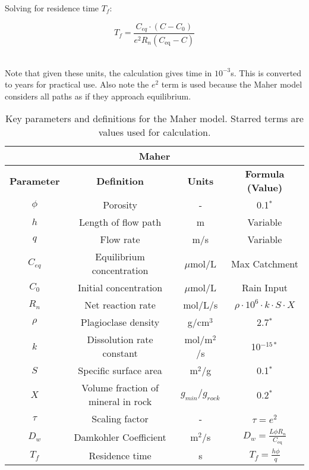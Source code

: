 \begin{tcolorbox}
{\begin{multicols}{2}

Solving for residence time \( T_f \):

\columnbreak
\begin{equation}
    T_f = \frac{C_{eq} \cdot \left(C - C_0\right)}{e^2 R_n \left( C_{\text{eq}} - C \right)}
\end{equation}
\

\end{multicols}

Note that given these units, the calculation gives time in \( 10^{-3} \)s. This is converted to years for practical use. Also note the $e^2$ term is used because the Maher model considers all paths as if they approach equilibrium.

\begin{table}[H]
    \centering
    \begin{tabular}{|c|c|c|c|}
        \hline  %
        \multicolumn{4}{|c|}{\textbf{Maher}} \\  
        \hline
        \textbf{Parameter} & \textbf{Definition} & \textbf{Units} & \textbf{Formula (Value)} \\  
        $\phi$ & Porosity & - & 0.1$^*$ \\
        $h$ & Length of flow path & m & Variable \\
        $q$ & Flow rate & m/s & Variable \\
        $C_{eq}$ & Equilibrium concentration & $\mu$mol/L & Max Catchment \\
        $C_0$ & Initial concentration & $\mu$mol/L & Rain Input \\
        $R_n$ & Net reaction rate & mol/L/s & $\rho \cdot 10^6 \cdot k \cdot S \cdot X $ \\
        $\rho$ & Plagioclase density & g/cm$^3$ & 2.7$^*$ \\
        $k$ & Dissolution rate constant & mol/m$^2$/s & 10$^{-15*}$ \\
        $S$ & Specific surface area & m$^2$/g & 0.1$^*$ \\
        $X$ & Volume fraction of mineral in rock & $g_{min}/g_{rock}$& 0.2$^*$ \\
        $\tau$ & Scaling factor & - & $\tau = e^2$ \\
        $D_w$ & Damkohler Coefficient & m$^2$/s & $D_w = \frac{L \phi R_n}{C_{\text{eq}}}$ \\
        $T_f$ & Residence time & s & $T_f = \frac{h \phi}{q}$ \\
        \hline
    \end{tabular}
    \caption{Key parameters and definitions for the Maher model. Starred terms are values used for calculation.}
    \label{tab:parameters4}
\end{table}

\FloatBarrier}




\end{tcolorbox}


